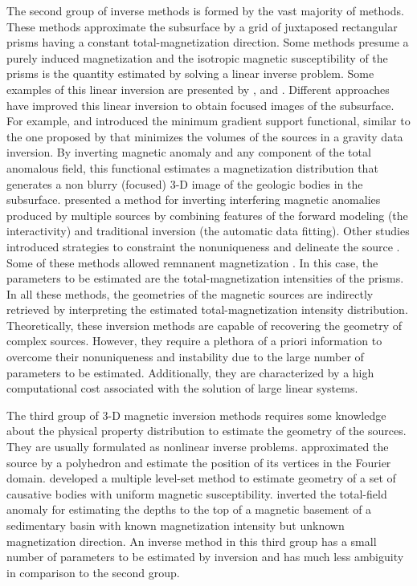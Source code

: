 The second group of inverse methods is formed by the vast majority of methods. 
These methods approximate the subsurface by a grid of juxtaposed rectangular prisms having 
a constant total-magnetization direction. Some methods presume a purely induced 
magnetization and the isotropic magnetic susceptibility of the prisms is the quantity estimated by solving a linear inverse problem. 
Some examples of this linear inversion are presented by \cite{cribb-1976}, \cite{li_3-d_1996} and \cite{pilkington_3-d_1997}.
Different approaches have improved this linear inversion to obtain focused images of the subsurface. 
For example, \cite{portniaguine_focusing_1999} and \cite{portniaguine_3d_2002} introduced the minimum gradient support functional, similar to the one proposed by
\cite{last-1983} that minimizes the volumes of the sources in a gravity data inversion. 
By inverting magnetic anomaly and any component of the total anomalous field, this functional estimates a magnetization distribution that generates a non blurry (focused) 3-D image of the geologic bodies in the subsurface.
\cite{barbosa_interactive_2006} presented a method for inverting interfering magnetic anomalies produced by multiple sources by combining features of the forward modeling (the interactivity) and traditional inversion (the automatic data fitting). Other studies introduced strategies to constraint the nonuniqueness and delineate the source \cite[]{tontini,pilkington_3d_2009,shamsipour_3d_2011,cella_inversion_2012,abedi-2015}. 
Some of these methods allowed remnanent magnetization \cite[e.g., ][]{pignatelli-2006}. 
In this case, the parameters to be estimated are the total-magnetization intensities 
of the prisms. 
In all these methods, the geometries of the magnetic sources are indirectly retrieved by interpreting the estimated total-magnetization intensity 
distribution. 
Theoretically, these inversion methods are capable of recovering the geometry of complex 
sources. However, they require a plethora of a priori information to overcome 
their nonuniqueness and instability due to the large number of parameters 
to be estimated. Additionally, they are characterized by a high 
computational cost associated with the solution of large linear systems.

The third group of 3-D magnetic inversion methods requires some knowledge about the 
physical property distribution to estimate the geometry of the sources. 
They are usually formulated as nonlinear inverse problems. 
\cite{wang_inversion_1990} approximated the source by a polyhedron and estimate 
the position of its vertices in the Fourier domain. 
\cite{wenbin-2017} developed a multiple level-set method to estimate geometry 
of a set of causative bodies with uniform magnetic susceptibility. 
\cite{hidalgo-2019} inverted the total-field anomaly for estimating the depths to the top of a magnetic basement of a sedimentary basin with known magnetization intensity but unknown magnetization direction. 
An inverse method in this third group has a small number of parameters to be estimated by inversion and has much less ambiguity in comparison to the second group. 

